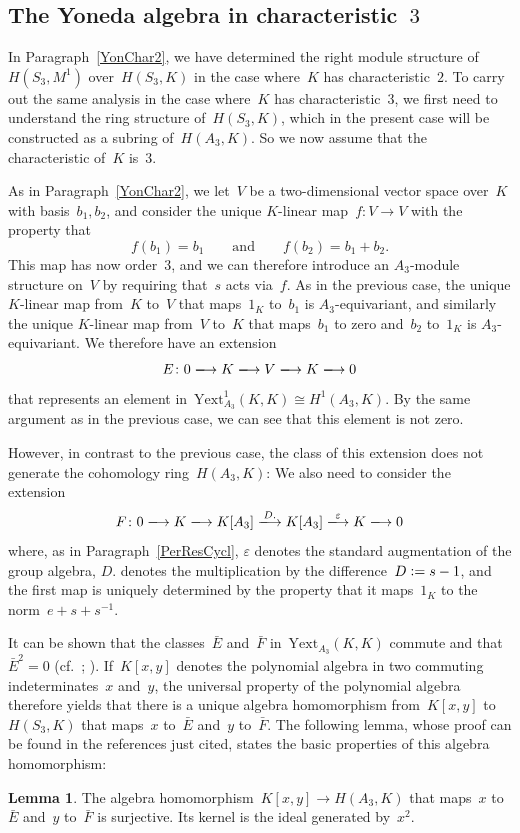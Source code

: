 \documentclass[12pt]{article}
\theoremstyle{definition}
\newtheorem{Lemma}[Satz]{Lemma}
\theoremstyle{break}
\newcommand{\Yext}{\mathrm{Yext}}
\renewcommand{\1}{\mathbbm{1}}
\newcommand{\deq}{\vcentcolon =}
\begin{document}
\subsection{The Yoneda algebra in characteristic~$3$} \label{YonAlgChar3}
In Paragraph~\ref{YonChar2}, we have determined the right module structure of~$H(S_3, M^1)$ over~$H(S_3, K)$ in the case where~$K$ has characteristic~$2$. To carry out the same analysis in the case where~$K$ has characteristic~$3$, we first need to understand the ring structure of~$H(S_3, K)$, which in the present case will be constructed as a subring of~$H(A_3, K)$. So we now assume that the characteristic of~$K$ is~$3$.

As in Paragraph~\ref{YonChar2}, we let~$V$ be a two-dimensional vector space over~$K$ with basis~$b_1,b_2$, and consider the unique $K$-linear map~$f \colon V \to V$ with the property that
\[f(b_1) = b_1 \qquad \text{and} \qquad f(b_2) = b_1 + b_2.\]
This map has now order~$3$, and we can therefore introduce an $A_3$-module structure on~$V$ by requiring that~$s$ acts via~$f$. As in the previous case, the unique $K$-linear map from~$K$ to~$V$ that maps~$1_K$ to~$b_1$ is $A_3$-equivariant, and similarly the unique $K$-linear map from~$V$ to~$K$ that maps~$b_1$ to zero and~$b_2$ to~$1_K$ is $A_3$-equivariant. We therefore have an extension
\[E \colon 0 \xlongrightarrow{} K \xlongrightarrow{} V \xlongrightarrow{} K
\xlongrightarrow{} 0\]
that represents an element in~$\Yext_{A_3}^1(K,K) \cong H^1(A_3, K)$. By the same argument as in the previous case, we can see that this element is not zero.

However, in contrast to the previous case, the class of this extension does not generate the cohomology ring~$H(A_3, K)$: We also need to consider the extension
\[F \colon 0 \xlongrightarrow{} K \xlongrightarrow{} K[A_3] \xlongrightarrow{D.} K[A_3] \xlongrightarrow{\varepsilon} K \xlongrightarrow{} 0\]
where, as in Paragraph~\ref{PerResCycl}, $\varepsilon$ denotes the standard augmentation of the group algebra, $D.$ denotes the multiplication
by the difference~$D \deq s - 1$, and the first map is uniquely determined by the property that it maps~$1_K$ to the norm~$e + s + s^{-1}$.

It can be shown that the classes~$\bar{E}$ and~$\bar{F}$ in~$\Yext_{A_3}(K,K)$ commute and that~\mbox{$\bar{E}^2 = 0$} (cf.~\cite[Prop.~3.5.5, p.~67]{Be}; \cite[Sec.~3.2, p.~26]{E}). If~$K[x,y]$ denotes the polynomial algebra in two commuting indeterminates~$x$ and~$y$, the universal property of the polynomial algebra therefore yields that there is a unique algebra homomorphism from~$K[x,y]$ to~$H(S_3, K)$ that maps~$x$ to~$\bar{E}$ and~$y$ to~$\bar{F}$. The following lemma, whose proof can be found in the references just cited, states the basic properties of this algebra homomorphism:
\begin{Lemma} \label{IsomChar3}
The algebra homomorphism~$K[x,y] \to H(A_3, K)$ that maps~$x$ to~$\bar{E}$ and~$y$
to~$\bar{F}$ is surjective. Its kernel is the ideal generated by~$x^2$.
\end{Lemma}
\end{document}
